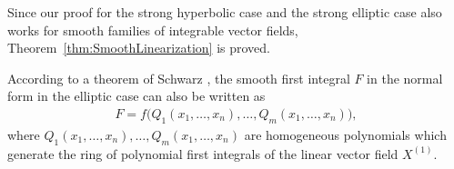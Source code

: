 Since our proof for the strong hyperbolic case and the strong elliptic case also works for smooth families of integrable vector f\/ields,
Theorem~\ref{thm:SmoothLinearization} is proved.

\begin{Remark}
According to a theorem of Schwarz \cite{Schwarz-Invariant1975},
the smooth f\/irst integral $F$ in the normal form in the elliptic case can also be written as
\begin{gather*}
 F = f\big(Q_1(x_1,\dots,x_n), \dots, Q_m(x_1,\dots,x_n)\big),
\end{gather*}
where $Q_1(x_1,\dots,x_n), \dots, Q_m(x_1,\dots,x_n)$ are homogeneous polynomials which generate
the ring of polynomial f\/irst integrals of the linear vector f\/ield $X^{(1)}$.
\end{Remark}
